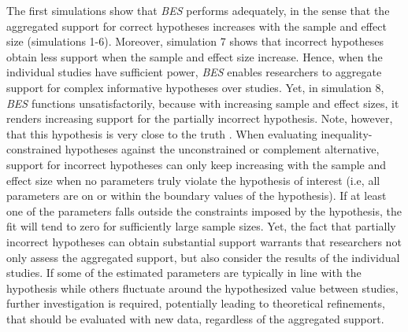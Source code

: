 \documentclass[review, 3p, authoryear]{elsarticle} %
\begin{document}
The first simulations show that \emph{BES} performs adequately, in the sense that the aggregated support for correct hypotheses increases with the sample and effect size (simulations 1-6).
Moreover, simulation 7 shows that incorrect hypotheses obtain less support when the sample and effect size increase.
Hence, when the individual studies have sufficient power, \emph{BES} enables researchers to aggregate support for complex informative hypotheses over studies.
Yet, in simulation 8, \emph{BES} functions unsatisfactorily, because with increasing sample and effect sizes, it renders increasing support for the partially incorrect hypothesis.
Note, however, that this hypothesis is very close to the truth \citep[Bayes factors have been proven to prefer the model that is closest, in terms of Kullback-Leibler divergence, to the true data-generating model; see][]{ly_bf_2016, berger2013statistical}.
When evaluating inequality-constrained hypotheses against the unconstrained or complement alternative, support for incorrect hypotheses can only keep increasing with the sample and effect size when no parameters truly violate the hypothesis of interest (i.e, all parameters are on or within the boundary values of the hypothesis).
If at least one of the parameters falls outside the constraints imposed by the hypothesis, the fit will tend to zero for sufficiently large sample sizes.
Yet, the fact that partially incorrect hypotheses can obtain substantial support warrants that researchers not only assess the aggregated support, but also consider the results of the individual studies.
If some of the estimated parameters are typically in line with the hypothesis while others fluctuate around the hypothesized value between studies, further investigation is required, potentially leading to theoretical refinements, that should be evaluated with new data, regardless of the aggregated support.
\end{document}
